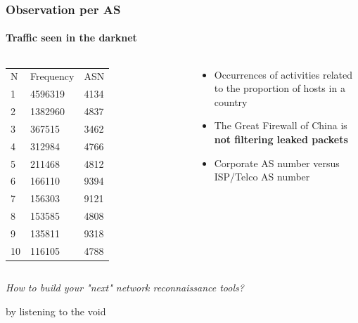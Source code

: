 \documentclass{beamer}
\begin{document}
\begin{frame}
\frametitle{Observation per AS}
\framesubtitle{Traffic seen in the darknet}

\begin{columns}[b]
   \column{4cm}
        \begin{tabular}{lll}
        N&Frequency& ASN\\
        1 & 4596319 &4134\\
        2 &1382960 &4837\\
        3 &367515 &3462\\
        4 &312984 &4766\\
        5 &211468 &4812\\
        6 &166110 &9394\\
        7 &156303 &9121\\
        8 &153585 &4808\\
        9 &135811 &9318\\
        10 &116105 &4788\\
        \end{tabular}
   \column{6.4cm}
   \begin{block}{}
   \begin{itemize}
   \item Occurrences of activities related to the proportion of hosts in a country
   \item The Great Firewall of China is {\bf not filtering leaked packets}
   \item Corporate AS number versus ISP/Telco AS number
   \end{itemize}
   \end{block}
 \end{columns}

\end{frame}

\begin{frame}
        {\center \it \Huge How to build your "next" network reconnaissance tools?\\}
        \begin{flushright}
        by listening to the void
        \end{flushright}
\end{frame}
\end{document}
